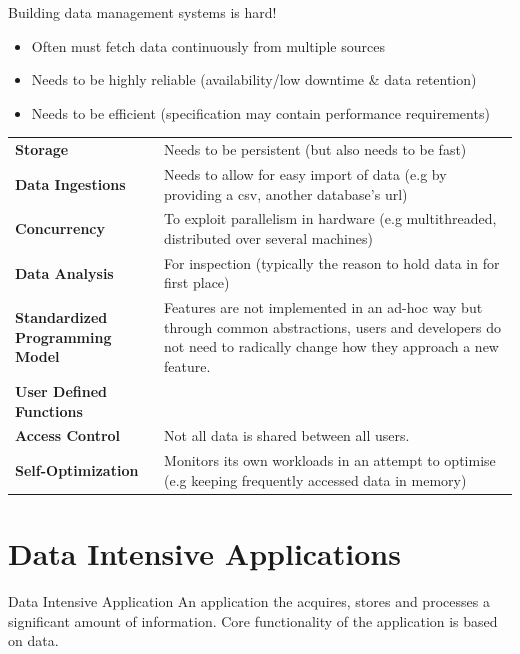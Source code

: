 Building data management systems is hard!
\begin{itemize}
    \item Often must fetch data continuously from multiple sources
    \item Needs to be highly reliable (availability/low downtime \& data retention)
    \item Needs to be efficient (specification may contain performance requirements)
\end{itemize}
\begin{center}
    \begin{tabular}{p{} p{}}
        \textbf{Storage}                        & Needs to be persistent (but also needs to be fast) \\
        \textbf{Data Ingestions}                & Needs to allow for easy import of data (e.g by providing a csv, another database's url) \\
        \textbf{Concurrency}                    & To exploit parallelism in hardware (e.g multithreaded, distributed over several machines) \\
        \textbf{Data Analysis}                  & For inspection (typically the reason to hold data in for first place) \\
        \textbf{Standardized Programming Model} & Features are not implemented in an ad-hoc way but through common abstractions, users and developers do not need to radically change how they approach a new feature. \\
        \textbf{User Defined Functions}         & \\
        \textbf{Access Control}                 & Not all data is shared between all users. \\
        \textbf{Self-Optimization}              & Monitors its own workloads in an attempt to optimise (e.g keeping frequently accessed data in memory) \\
    \end{tabular}
\end{center}

\section{Data Intensive Applications}
\begin{definitionbox}{Data Intensive Application}
    An application the acquires, stores and processes a significant amount of information.
    Core functionality of the application is based on data.
\end{definitionbox}

